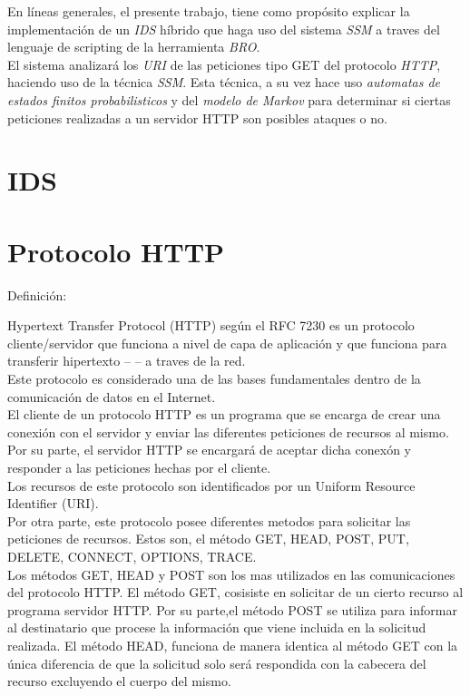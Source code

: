 \documentclass{article}
\begin{document}
En l\'ineas generales, el presente trabajo, tiene como prop\'osito explicar la implementaci\'on de un \textit{IDS} híbrido que haga uso del sistema \textit{SSM} a traves del lenguaje de scripting de la herramienta \textit{BRO}.\\

El sistema analizar\'a los \textit{URI} de las peticiones tipo GET del protocolo \textit{HTTP}, haciendo uso de la t\'ecnica \textit{SSM}. Esta t\'ecnica, a su vez hace uso \textit{automatas de estados finitos probabilisticos} y del \textit{modelo de Markov} para determinar si ciertas peticiones realizadas a un servidor HTTP son posibles ataques o no.


\section{IDS}
\section{Protocolo HTTP}

Definici\'on:

Hypertext Transfer Protocol (HTTP) seg\'un el RFC 7230 es un protocolo cliente/servidor que funciona a nivel de capa de aplicaci\'on y que funciona para transferir hipertexto -- -- a traves de la red.\\

 Este protocolo es considerado una de las bases fundamentales dentro de la comunicaci\'on de datos en el Internet.\\
 
 El cliente de un protocolo HTTP es un programa que se encarga de crear una conexi\'on con el servidor y enviar las diferentes peticiones de recursos al mismo. Por su parte, el servidor HTTP se encargar\'a de aceptar dicha conex\'on y responder a las peticiones hechas por el cliente.\\
 
Los recursos de este protocolo son identificados por un Uniform Resource Identifier (URI).\\

Por otra parte, este protocolo posee diferentes metodos para solicitar las peticiones de recursos. Estos son, el m\'etodo GET, HEAD, POST, PUT, DELETE, CONNECT, OPTIONS, TRACE. \\

Los m\'etodos GET, HEAD y POST son los mas utilizados en las comunicaciones del protocolo HTTP. El m\'etodo GET, cosisiste en solicitar de un cierto recurso al programa servidor HTTP. Por su parte,el m\'etodo POST se utiliza para informar al destinatario que procese la informaci\'on que viene incluida en la solicitud realizada. El m\'etodo HEAD, funciona de manera identica al m\'etodo GET con la \'unica diferencia de que la solicitud solo ser\'a respondida con la cabecera del recurso excluyendo el cuerpo del mismo.\\
\end{document}
